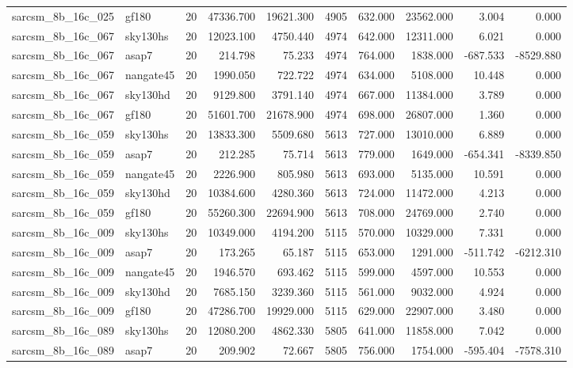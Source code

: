 \begin{tabular}{llrrrrrrrr}
sarcsm\_8b\_16c\_025 & gf180 & 20 & 47336.700 & 19621.300 & 4905 & 632.000 & 23562.000 & 3.004 & 0.000 \\
sarcsm\_8b\_16c\_067 & sky130hs & 20 & 12023.100 & 4750.440 & 4974 & 642.000 & 12311.000 & 6.021 & 0.000 \\
sarcsm\_8b\_16c\_067 & asap7 & 20 & 214.798 & 75.233 & 4974 & 764.000 & 1838.000 & -687.533 & -8529.880 \\
sarcsm\_8b\_16c\_067 & nangate45 & 20 & 1990.050 & 722.722 & 4974 & 634.000 & 5108.000 & 10.448 & 0.000 \\
sarcsm\_8b\_16c\_067 & sky130hd & 20 & 9129.800 & 3791.140 & 4974 & 667.000 & 11384.000 & 3.789 & 0.000 \\
sarcsm\_8b\_16c\_067 & gf180 & 20 & 51601.700 & 21678.900 & 4974 & 698.000 & 26807.000 & 1.360 & 0.000 \\
sarcsm\_8b\_16c\_059 & sky130hs & 20 & 13833.300 & 5509.680 & 5613 & 727.000 & 13010.000 & 6.889 & 0.000 \\
sarcsm\_8b\_16c\_059 & asap7 & 20 & 212.285 & 75.714 & 5613 & 779.000 & 1649.000 & -654.341 & -8339.850 \\
sarcsm\_8b\_16c\_059 & nangate45 & 20 & 2226.900 & 805.980 & 5613 & 693.000 & 5135.000 & 10.591 & 0.000 \\
sarcsm\_8b\_16c\_059 & sky130hd & 20 & 10384.600 & 4280.360 & 5613 & 724.000 & 11472.000 & 4.213 & 0.000 \\
sarcsm\_8b\_16c\_059 & gf180 & 20 & 55260.300 & 22694.900 & 5613 & 708.000 & 24769.000 & 2.740 & 0.000 \\
sarcsm\_8b\_16c\_009 & sky130hs & 20 & 10349.000 & 4194.200 & 5115 & 570.000 & 10329.000 & 7.331 & 0.000 \\
sarcsm\_8b\_16c\_009 & asap7 & 20 & 173.265 & 65.187 & 5115 & 653.000 & 1291.000 & -511.742 & -6212.310 \\
sarcsm\_8b\_16c\_009 & nangate45 & 20 & 1946.570 & 693.462 & 5115 & 599.000 & 4597.000 & 10.553 & 0.000 \\
sarcsm\_8b\_16c\_009 & sky130hd & 20 & 7685.150 & 3239.360 & 5115 & 561.000 & 9032.000 & 4.924 & 0.000 \\
sarcsm\_8b\_16c\_009 & gf180 & 20 & 47286.700 & 19929.000 & 5115 & 629.000 & 22907.000 & 3.480 & 0.000 \\
sarcsm\_8b\_16c\_089 & sky130hs & 20 & 12080.200 & 4862.330 & 5805 & 641.000 & 11858.000 & 7.042 & 0.000 \\
sarcsm\_8b\_16c\_089 & asap7 & 20 & 209.902 & 72.667 & 5805 & 756.000 & 1754.000 & -595.404 & -7578.310 \\

\end{tabular}
